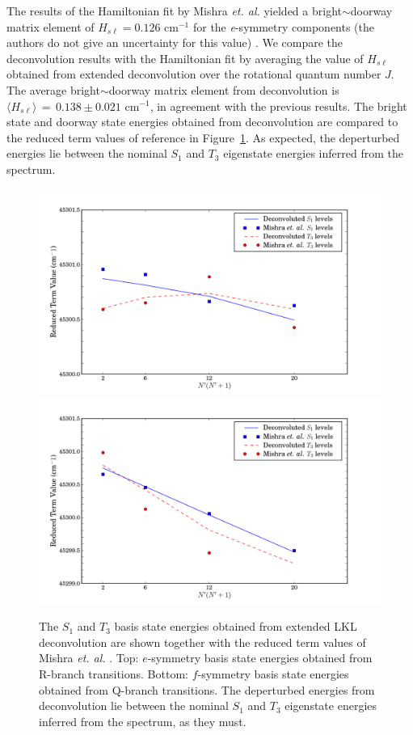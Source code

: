 The results of the Hamiltonian fit by Mishra \emph{et. al.} yielded a
bright$\sim$doorway matrix element of $H_{s\ell} = 0.126$ cm$^{-1}$
for the \emph{e}-symmetry components (the authors do not give an
uncertainty for this value) \cite{mishra04}.  We compare the
deconvolution results with the Hamiltonian fit by averaging the value
of $H_{s\ell}$ obtained from extended deconvolution over the
rotational quantum number $J$.  The average bright$\sim$doorway matrix
element from deconvolution is $\langle H_{s\ell} \rangle \, = \, 0.138
\pm 0.021$ cm$^{-1}$, in agreement with the previous results.  The
bright state and doorway state energies obtained from deconvolution
are compared to the reduced term values of reference \cite{mishra04}
in Figure~\ref{fig:ryan-comparison}.  As expected, the deperturbed
energies lie between the nominal $S_1$ and $T_3$ eigenstate
energies inferred from the spectrum.

\begin{figure}
  \caption{The $S_1$ and $T_3$ basis state energies obtained from
    extended LKL deconvolution are shown together with the reduced
    term values of Mishra \emph{et. al.} \cite{mishra04}.  Top:
    $e$-symmetry basis state energies obtained from R-branch
    transitions.  Bottom: $f$-symmetry basis state energies obtained
    from Q-branch transitions. The deperturbed energies from
    deconvolution lie between the nominal $S_1$ and $T_3$ eigenstate
    energies inferred from the spectrum, as they must.}
  \label{fig:ryan-comparison}
  \centering
  \includegraphics[width=6.5in]{ryan-comparison-r.png}
  \includegraphics[width=6.5in]{ryan-comparison-q.png}
\end{figure}

